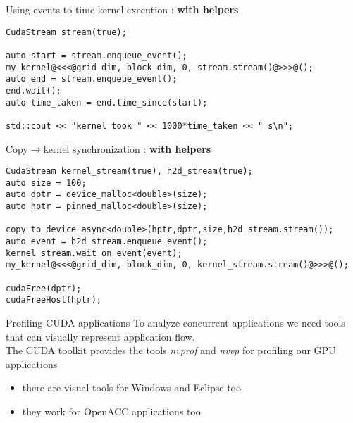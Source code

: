 \begin{frame}[fragile]{}
    \begin{code}{Using events to time kernel execution : \textbf{with helpers}}
        \begin{lstlisting}[style=boxcudatiny]
CudaStream stream(true);

auto start = stream.enqueue_event();
my_kernel@<<<@grid_dim, block_dim, 0, stream.stream()@>>>@();
auto end = stream.enqueue_event();
end.wait();
auto time_taken = end.time_since(start);

std::cout << "kernel took " << 1000*time_taken << " s\n";
        \end{lstlisting}
    \end{code}
    \begin{code}{Copy$\rightarrow$kernel synchronization : \textbf{with helpers}}
        \begin{lstlisting}[style=boxcudatiny]
CudaStream kernel_stream(true), h2d_stream(true);
auto size = 100;
auto dptr = device_malloc<double>(size);
auto hptr = pinned_malloc<double>(size);

copy_to_device_async<double>(hptr,dptr,size,h2d_stream.stream());
auto event = h2d_stream.enqueue_event();
kernel_stream.wait_on_event(event);
my_kernel@<<<@grid_dim, block_dim, 0, kernel_stream.stream()@>>>@();

cudaFree(dptr);
cudaFreeHost(hptr);
        \end{lstlisting}
    \end{code}
\end{frame}

\begin{frame}[fragile]{}
    \begin{info}{Profiling CUDA applications}
        To analyze concurrent applications we need tools that can visually represent application flow.
        \\
        The CUDA toolkit provides the tools \emph{nvprof} and \emph{nvvp} for profiling our GPU applications
        \begin{itemize}
            \item there are visual tools for Windows and Eclipse too
            \item they work for OpenACC applications too
        \end{itemize}
    \end{info}

\end{frame}

